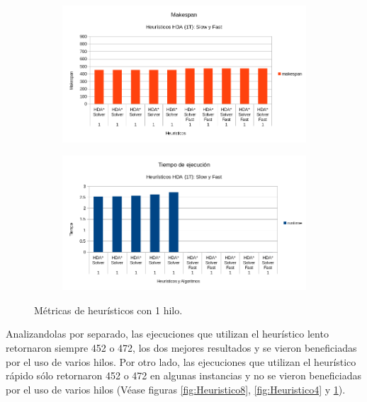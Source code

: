 \begin{figure}[h]
    \begin{subfigure}{.5\textwidth}
        \begin{center}
            \includegraphics[width=\textwidth]{Media/Ch2/Makespan_1_Heuristics.png}
        \end{center}
    \end{subfigure}
    \begin{subfigure}{.5\textwidth}
        \begin{center}
            \includegraphics[width=\textwidth]{Media/Ch2/Runtime_1_Heuristics.png}
        \end{center}
    \end{subfigure}
    \caption{Métricas de heurísticos con 1 hilo.}
    \label{fig:Heuristico1}
\end{figure}

Analizandolas por separado, las ejecuciones que utilizan el heurístico lento
retornaron siempre 452 o 472, los dos mejores resultados y se vieron
beneficiadas por el uso de varios hilos.
Por otro lado, las ejecuciones que utilizan el heurístico rápido
sólo retornaron 452 o 472 en algunas instancias y no se vieron
beneficiadas por el uso de varios hilos
(Véase figuras \ref{fig:Heuristico8}, \ref{fig:Heuristico4} y \ref{fig:Heuristico1}).

